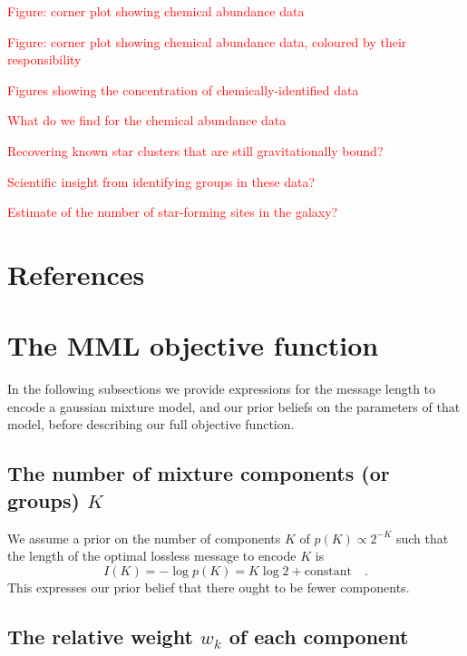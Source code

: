 \documentclass{elsarticle}
\newcommand{\todo}[1]{\textcolor{red}{#1}}
\newcommand{\prior}[1]{p\left(#1\right)}
\begin{document}
\todo{Figure: corner plot showing chemical abundance data}

\todo{Figure: corner plot showing chemical abundance data, coloured by their responsibility}

\todo{Figures showing the concentration of chemically-identified data}



\todo{What do we find for the chemical abundance data}

\todo{Recovering known star clusters that are still gravitationally bound?}

\todo{Scientific insight from identifying groups in these data?}

\todo{Estimate of the number of star-forming sites in the galaxy?}



\section{References}



\appendix

\section{The MML objective function}
\label{app:mml_derivation}
In the following subsections we provide expressions for the message length to
encode a gaussian mixture model, and our prior beliefs on the parameters of that model, before describing our
full objective function.

\subsection{The number of mixture components (or groups) $K$}

We assume a prior on the number of components $K$ of $\prior{K} \propto 2^{-K}$
\cite[][p279, sec. 6.8.2]{Wallace:2005} such that the length of the 
optimal lossless message to encode $K$ is 
\begin{equation}
    I(K) = -\log{\prior{K}} = K\log{2} + \textrm{constant} \quad .
\end{equation}
This  expresses our prior belief that there ought to be fewer components.



\subsection{The relative weight $w_k$ of each component}
\end{document}

